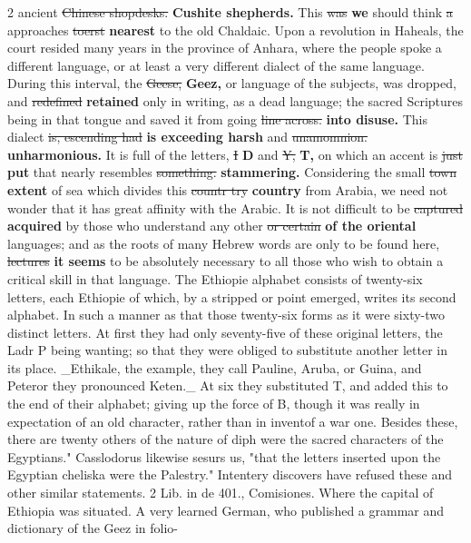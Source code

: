\documentclass[10pt]{article}
\begin{document}
\begin{multicols}{2}
ancient \sout{Chinese shopdesks.} \textbf{Cushite shepherds.} This \sout{was} \textbf{we} should think \sout{a} approaches \sout{toerst} \textbf{nearest} to the old Chaldaic. Upon a revolution in Haheals, the court resided many years in the province of Anhara, where the people spoke a different language, or at least a very different dialect of the same language. During this interval, the \sout{Geese,} \textbf{Geez,} or language of the subjects, was dropped, and \sout{redefined} \textbf{retained} only in writing, as a dead language; the sacred Scriptures being in that tongue and saved it from going \sout{line across.} \textbf{into disuse.} This dialect \sout{is, escending had} \textbf{is exceeding harsh} and \sout{unamomnion.} \textbf{unharmonious.} It is full of the letters, \sout{I} \textbf{D} and \sout{Y,} \textbf{T,} on which an accent is \sout{just} \textbf{put} that nearly resembles \sout{something.} \textbf{stammering.} Considering the small \sout{town} \textbf{extent} of sea which divides this \sout{countr try} \textbf{country} from Arabia, we need not wonder that it has great affinity with the Arabic. It is not difficult to be \sout{captured} \textbf{acquired} by those who understand any other \sout{or certain} \textbf{of the oriental} languages; and as the roots of many Hebrew words are only to be found here, \sout{lectures} \textbf{it seems} to be absolutely necessary to all those who wish to obtain a critical skill in that language. The Ethiopie alphabet consists of twenty-six letters, each Ethiopie of which, by a stripped or point emerged, writes its second alphabet. In such a manner as that those twenty-six forms as it were sixty-two distinct letters. At first they had only seventy-five of these original letters, the Ladr P being wanting; so that they were obliged to substitute another letter in its place. \_Ethikale, the example, they call Pauline, Aruba, or Guina, and Peteror they pronounced Keten.\_ At six they substituted T, and added this to the end of their alphabet; giving up the force of B, though it was really in expectation of an old character, rather than in inventof a war one. Besides these, there are twenty others of the nature of diph were the sacred characters of the Egyptians." Casslodorus likewise sesurs us, "that the letters inserted upon the Egyptian cheliska were the Palestry." Intentery discovers have refused these and other similar statements. 2 Lib. in de 401., Comisiones. Where the capital of Ethiopia was situated. A very learned German, who published a grammar and dictionary of the Geez in folio-
\end{multicols}
\end{document}
